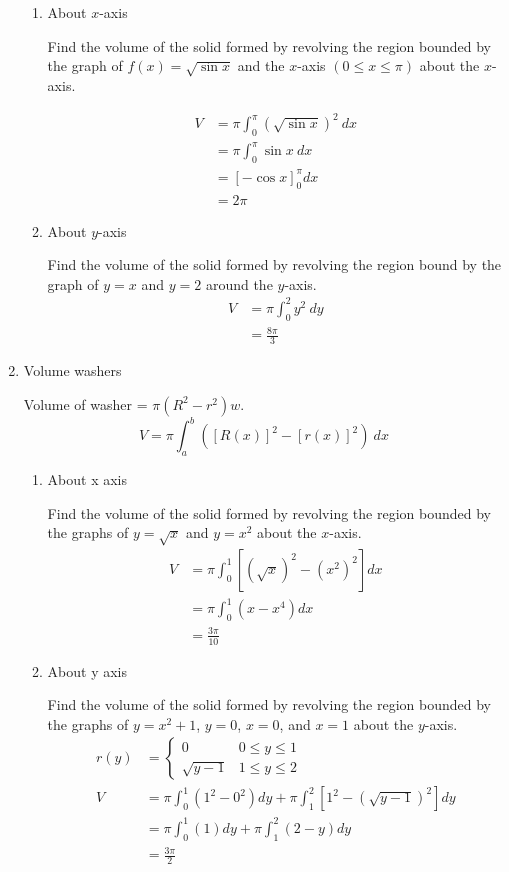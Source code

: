 \documentclass[fleqn]{article}
\begin{document}
\begin{enumerate}
\begin {enumerate}
\item About $x$-axis

Find the volume of the solid formed by revolving the region bounded by the graph of $f(x)=\sqrt{\sin x}$ and the $x$-axis $(0 \leq x \leq \pi)$ about the $x$-axis.

\begin{align*}
V &= \pi \int _0^{\pi} (\sqrt{\sin{x}})^2 \ dx\\
&= \pi \int _0^{\pi} \sin x \ dx\\
&= \left[-\cos x \right]_0^\pi dx\\
&= 2\pi
\end{align*}

\item About $y$-axis

Find the volume of the solid formed by revolving the region bound by the graph of $y = x$ and $y = 2$ around the $y$-axis.
\begin{align*}
V &= \pi \int _0^{2} y^2 \ dy\\
&= \frac{8\pi}{3}
\end{align*}

\end{enumerate}
\item Volume washers

Volume of washer = $\pi(R^2 -r^2)w$.
\begin{equation*}
V = \pi \int_a^b \left( \left [ R(x)\right]^2 - \left[ r(x) \right]^2 \right) \ dx
\end{equation*}

\begin {enumerate}

\item About x axis

Find the volume of the solid formed by revolving the region bounded by the graphs of $y= \sqrt{x}$ and $y=x^2$ about the $x$-axis.
\begin{align*}
V &= \pi \int_0^1 \left[\left(\sqrt x \right)^2 - (x^2)^2 \right]dx\\
&= \pi \int _0^1 (x - x^4)dx\\
&= \frac{3\pi}{10}
\end{align*}

\item About y axis

Find the volume of the solid formed by revolving the region bounded by the graphs of $y=x^2+1$, $y=0$, $x=0$, and $x=1$ about the $y$-axis.
\begin{align*}
r(y)&=\begin{cases}
    0&  0 \leq y \leq 1\\
    \sqrt{y-1}&  1 \leq y \leq 2
\end{cases}\\
V &= \pi \int _0^1 (1^2 - 0 ^2)dy + \pi \int _1^2 \left[1^2 - \left(\sqrt{y-1}\right)^2\right]dy\\
&= \pi \int _0^1 (1)dy + \pi \int _1^2 (2-y)dy\\
&=  \frac{3\pi}{2}
\end{align*}


\end{enumerate}
\end{enumerate}
\end{document}
